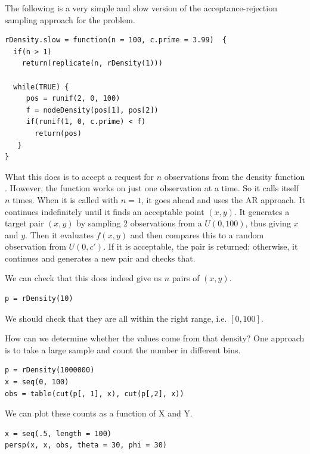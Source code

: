 The following is a very simple and slow version of the
acceptance-rejection sampling approach for the problem.
{\footnotesize{
\begin{verbatim}
rDensity.slow = function(n = 100, c.prime = 3.99)  {
  if(n > 1)
    return(replicate(n, rDensity(1)))

  while(TRUE) {
     pos = runif(2, 0, 100)
     f = nodeDensity(pos[1], pos[2])
     if(runif(1, 0, c.prime) < f)
       return(pos)
   }
}
\end{verbatim}
}}
What this does is to accept a request for $n$ observations from the
density function .  However, the function works
on just one observation at a time. So it calls itself $n$ times.  When
it is called with $n = 1$, it goes ahead and uses the AR approach.  It
continues indefinitely until it finds an acceptable point $(x, y)$.
It generates a target pair $(x, y)$ by sampling 2 observations from a
$U(0, 100)$, thus giving $x$ and $y$.  Then it evaluates $f(x, y)$ and
then compares this to a random observation from $U(0, c')$.  If it is
acceptable, the pair is returned; otherwise, it continues and
generates a new pair and checks that.


We can check that this does indeed give us $n$ pairs of $(x, y)$.
\begin{verbatim}
p = rDensity(10)
\end{verbatim}
We should check that they are all within the right range, i.e. $[0,
100]$.

How can we  determine whether the values come from that
density?
One approach is to take a large sample and count the number
in different bins.
\begin{verbatim}
p = rDensity(1000000)
x = seq(0, 100)
obs = table(cut(p[, 1], x), cut(p[,2], x))
\end{verbatim}
We can plot these counts as a function of 
X and Y.
\begin{verbatim}
x = seq(.5, length = 100)
persp(x, x, obs, theta = 30, phi = 30)
\end{verbatim}


